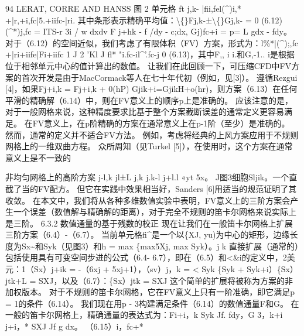 \documentclass[UTF8,11pt,a4paper,openany,fontset=fandol]{ctexbook}
\begin{document}
94 LERAT, CORRE AND HANSS 图 2 单元格 ft j,k- |fii,fel(\textasciicircum{})i,* +|r,+i,fc|5.+iifc-|ri. 其中条形表示精确平均值：\textbackslash\{\}Fj,k-±\textbackslash\{\}Gj,k- = 0 (6.12) (\textasciicircum{}*)j,fc = ITS-r 3i / w dxdv F j+hk - f /dy - c;dx, Gj)fc+i = p= L gdx - fdy。 对于（6.12）的空间近似，我们考虑了有限体积（FV）方案，形式为：l\%*|(\textasciicircum{});,fc +|ri+iife|Fi+iifc 1 J 2 'Kl J fl* "i.fc-il\textasciicircum{}'.fc-j 0 (6.13)，其中F,, i i.和G,-1.. i是根据位于相邻单元中心的值计算出的数值。 让我们在此回顾一下，可压缩CFD中FV方案的首次开发是由于MacCormack等人在七十年代初（例如，见[3]）。 遵循Rezgui [4]，如果Fj+i,k = Fj+i,k + 0(hP) Gjik+i=GjikH+o(hr)，则方案（6.13）在任何平滑的精确解（6.14）中，则在FV意义上的顺序p上是准确的。 应该注意的是，对于一般网格来说，这种精度要求比基于整个方案截断误差的通常定义更容易满足。 在FV意义上，在p阶精确的方案在通常意义上在p-1阶（至少）是准确的。 然而，通常的定义并不适合FV方法。 例如，考虑将经典的上风方案应用于不规则网格上的一维双曲方程。 众所周知（见Turkel [5]），在使用时，这个方案在通常意义上是不一致的

非均匀网格上的高阶方案 j-l,k jl±L j,k j.k-l j+l.l «yt 5x。 J图3细胞Sljik。一个直截了当的FV配方。 但它在实践中效果相当好，Sanders [6]用适当的规范证明了其收敛。 在本文中，我们将从各种多维数值实验中表明，FV意义上的三阶方案会产生一个误差（数值解与精确解的距离），对于完全不规则的笛卡尔网格来说实际上是三阶。 6.3.2 数值通量的基于残数的校正 现在让我们在一般笛卡尔网格上扩展三阶方案（6.4）-（6.7）。 当前单元格fi\textasciicircum{}是一个以\{XJ, yu)为中心的矩形，边缘长度为Sx\textasciitilde{}和Syk（见图3）和h = max \{max5Xj, max Syk）。j k 直接扩展（通常的）包括使用具有可变空间步进的公式（6.4- 6.7），即在（6.5）和<\&i的定义中，2美元：1（Sx）j+ik = -（6xj + 5xj+1），（sv）j，k = < Syk \{Syk + Syk+i）\{Sx）jtk+L = SXJ，以及（6.7）：\{Sx）jtk = SXJ 这个简单的扩展将被称为方案的非加权版本。 对于不规则的笛卡尔网格，它在FV意义上只有一阶准确，即它满足p = 1的条件（6.14）。 我们现在用p - 3构建满足条件（6.14）的数值通量F和G。 在一般的笛卡尔网格上，精确通量的表达式为：Fi+i，k Syk Jf. fdy，G 3，k+i j+i，* SXJ Jf g dx。 （6.15）i，fc+*
\end{document}

